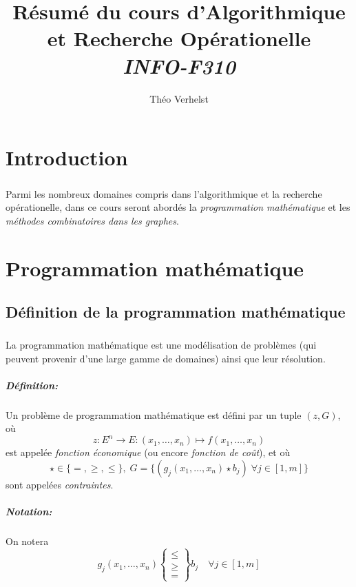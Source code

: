 \documentclass[a4paper]{report}
\author{Théo Verhelst}
\title{Résumé du cours d'Algorithmique et Recherche Opérationelle\\
\emph{INFO-F310}}
\begin{document}
\maketitle
\tableofcontents

\chapter{Introduction}
\paragraph{}
Parmi les nombreux domaines compris dans l'algorithmique et la recherche
opérationelle, dans ce cours seront abordés la \emph{programmation mathématique}
et les \emph{méthodes combinatoires dans les graphes}.

\chapter{Programmation mathématique}
\section{Définition de la programmation mathématique}
\paragraph{}
La programmation mathématique est une modélisation de problèmes (qui peuvent
provenir d'une large gamme de domaines) ainsi que leur résolution.

\paragraph{Définition:} Un problème de programmation mathématique est défini
par un tuple \((z, G)\), où
\[z:E^n\to E:(x_1,\dots,x_n)\mapsto f(x_1,\dots,x_n)\]
est appelée \emph{fonction économique} (ou encore \emph{fonction de coût}), et
où \[\star\in\{=,\ge,\le\},\;G=\{(g_j(x_1,\dots,x_n)\star b_j)\;\forall j\in[1,m]\}\]
sont appelées \emph{contraintes}.

\paragraph{Notation:}On notera
\[g_j(x_1,\dots,x_n)\begin{Bmatrix}\le\\\ge\\=\end{Bmatrix}b_j\quad\forall j\in[1,m]\]
\end{document}
